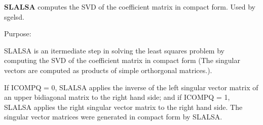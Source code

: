 {\bfseries S\+L\+A\+L\+S\+A} computes the S\+V\+D of the coefficient matrix in compact form. Used by sgelsd. 

 \begin{DoxyParagraph}{Purpose\+: }
\begin{DoxyVerb} SLALSA is an itermediate step in solving the least squares problem
 by computing the SVD of the coefficient matrix in compact form (The
 singular vectors are computed as products of simple orthorgonal
 matrices.).

 If ICOMPQ = 0, SLALSA applies the inverse of the left singular vector
 matrix of an upper bidiagonal matrix to the right hand side; and if
 ICOMPQ = 1, SLALSA applies the right singular vector matrix to the
 right hand side. The singular vector matrices were generated in
 compact form by SLALSA.\end{DoxyVerb}
 
\end{DoxyParagraph}

